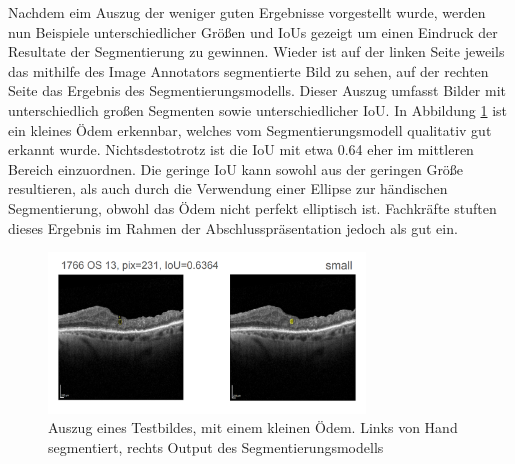 Nachdem eim Auszug der weniger guten Ergebnisse vorgestellt wurde, werden nun Beispiele unterschiedlicher Größen und IoUs gezeigt um einen Eindruck der Resultate der Segmentierung zu gewinnen.\newline
Wieder ist auf der linken Seite jeweils das mithilfe des Image Annotators segmentierte Bild zu sehen, auf der rechten Seite das Ergebnis des Segmentierungsmodells. Dieser Auszug umfasst Bilder mit unterschiedlich großen Segmenten sowie unterschiedlicher IoU.\newline
In Abbildung \ref{fig:ergebnis_good1} ist ein kleines Ödem erkennbar, welches vom Segmentierungsmodell qualitativ gut erkannt wurde. Nichtsdestotrotz ist die IoU mit etwa 0.64 eher im mittleren Bereich einzuordnen. Die geringe IoU kann sowohl aus der geringen Größe resultieren, als auch durch die Verwendung einer Ellipse zur händischen Segmentierung, obwohl das Ödem nicht perfekt elliptisch ist. Fachkräfte stuften dieses Ergebnis im Rahmen der Abschlusspräsentation jedoch als gut ein.
\begin{figure}[h]
\centering
\includegraphics[width=0.75\textwidth]{./pic/Segmentierung/Segmentierungsergebnisse/21.PNG}
\caption{\label{fig:ergebnis_good1}Auszug eines Testbildes, mit einem kleinen Ödem. Links von Hand segmentiert, rechts Output des Segmentierungsmodells}
\end{figure}


